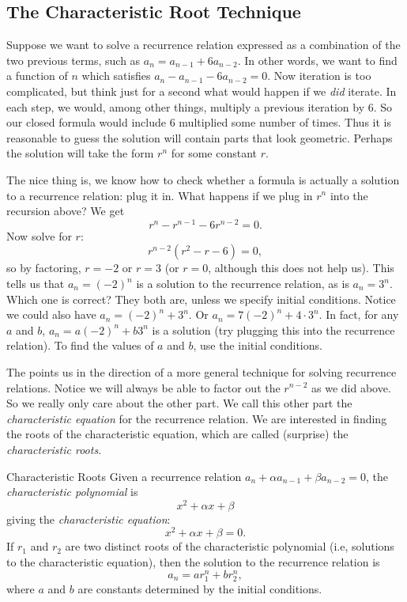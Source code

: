 \documentclass[12pt]{article}
\begin{document}
\subsection{The Characteristic Root Technique}

Suppose we want to solve a recurrence relation expressed as a combination of the two previous terms, such as $a_n = a_{n-1} + 6a_{n-2}$. In other words, we want to find a function of $n$ which satisfies $a_n - a_{n-1} - 6a_{n-2} = 0$.  Now iteration is too complicated, but think just for a second what would happen if we {\em did} iterate.  In each step, we would, among other things, multiply a previous iteration by 6.   So our closed formula would include $6$ multiplied some number of times.  Thus it is reasonable to guess the solution will contain parts that look geometric.  Perhaps the solution will take the form $r^n$ for some constant $r$.

The nice thing is, we know how to check whether a formula is actually a solution to a recurrence relation: plug it in.  What happens if we plug in $r^n$ into the recursion above? We get  \[r^n - r^{n-1} - 6r^{n-2} = 0.\]
Now solve for $r$: \[r^{n-2}(r^2 - r - 6) = 0,\]
so by factoring, $r = -2$ or $r = 3$ (or $r = 0$, although this does not help us).  This tells us that $a_n = (-2)^n$ is a solution to the recurrence relation, as is $a_n = 3^n$.  Which one is correct?  They both are, unless we specify initial conditions.  Notice we could also have $a_n = (-2)^n + 3^n$.  Or $a_n = 7(-2)^n + 4\cdot 3^n$.  In fact, for any $a$ and $b$, $a_n = a(-2)^n + b 3^n$ is a solution (try plugging this into the recurrence relation).  To find the values of $a$ and $b$, use the initial conditions.

The points us in the direction of a more general technique for solving recurrence relations.  Notice we will always be able to factor out the $r^{n-2}$ as we did above.  So we really only care about the other part.  We call this other part the \emph{characteristic equation} for the recurrence relation.  We are interested in finding the roots of the characteristic equation, which are called (surprise) the \emph{characteristic roots}.

\clearpage
\begin{defbox}{Characteristic Roots}
 Given a recurrence relation $a_n + \alpha a_{n-1} + \beta a_{n-2} = 0$, the \emph{characteristic polynomial} is
 \[x^2 + \alpha x + \beta\]
 giving the {\em characteristic equation}:
 \[x^2 + \alpha x + \beta = 0.\]
 If $r_1$ and $r_2$ are two distinct roots of the characteristic polynomial (i.e, solutions to the characteristic equation), then the solution to the recurrence relation is
 \[a_n = ar_1^n + br_2^n,\]
 where $a$ and $b$ are constants determined by the initial conditions.
\end{defbox}
\end{document}
